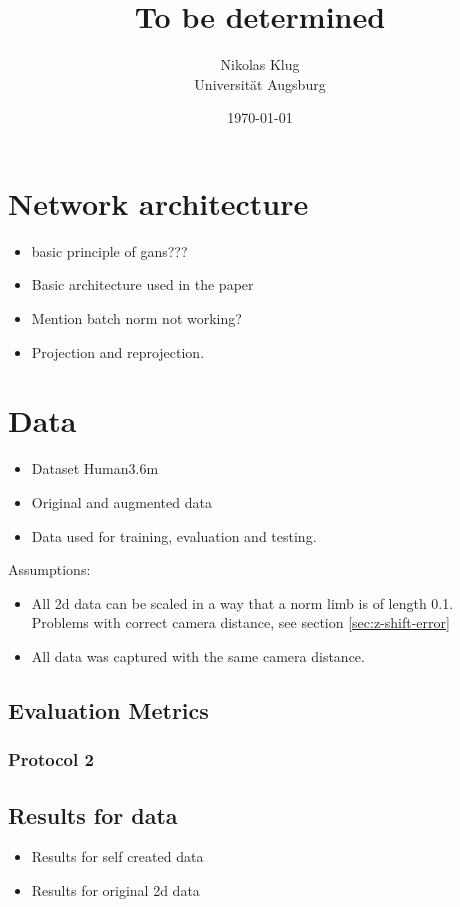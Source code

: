 \documentclass[11pt]{article}
\author{Nikolas Klug \\ Universität Augsburg}
\date{\today}
\title{To be determined}
\begin{document}
	\maketitle
	\newpage
	
	
	\newpage
	
	\tableofcontents
	\newpage

	
	
	\section{Network architecture}
	\begin{itemize}
		\item basic principle of gans???
		\item Basic architecture used in the paper
		\item Mention batch norm not working?
		\item Projection and reprojection.
	\end{itemize}
	\section{Data}
	\begin{itemize}
		\item Dataset Human3.6m
		\item Original and augmented data
		\item Data used for training, evaluation and testing.
	\end{itemize}
	Assumptions:
	\begin{itemize}
		\item All 2d data can be scaled in a way that a norm limb is of length 0.1. 
		Problems with correct camera distance, see section \ref{sec:z-shift-error}
		\item All data was captured with the same camera distance.
	\end{itemize}
	\subsection{Evaluation Metrics}
	\subsubsection{Protocol 2}\label{sec:protocol2}
	\subsection{Results for data}\label{sec:data-results}
	\begin{itemize}
		\item Results for self created data
		\item Results for original 2d data
	\end{itemize}
\end{document}
